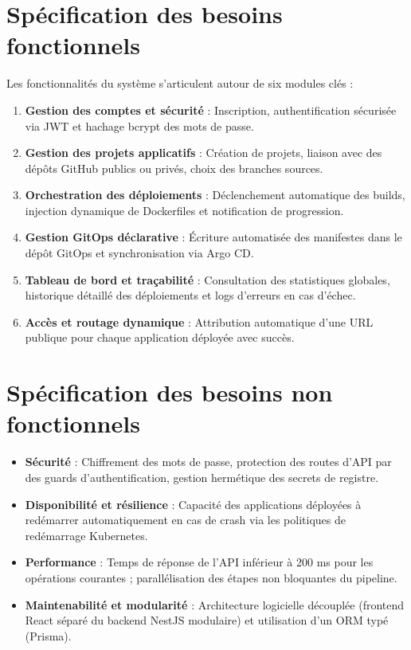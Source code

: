 \documentclass[12pt,a4paper,oneside]{report}
\begin{document}
\section{Spécification des besoins fonctionnels}
Les fonctionnalités du système s'articulent autour de six modules clés :
\begin{enumerate}
    \item \textbf{Gestion des comptes et sécurité} : Inscription, authentification sécurisée via JWT et hachage bcrypt des mots de passe.
    \item \textbf{Gestion des projets applicatifs} : Création de projets, liaison avec des dépôts GitHub publics ou privés, choix des branches sources.
    \item \textbf{Orchestration des déploiements} : Déclenchement automatique des builds, injection dynamique de Dockerfiles et notification de progression.
    \item \textbf{Gestion GitOps déclarative} : Écriture automatisée des manifestes dans le dépôt GitOps et synchronisation via Argo CD.
    \item \textbf{Tableau de bord et traçabilité} : Consultation des statistiques globales, historique détaillé des déploiements et logs d'erreurs en cas d'échec.
    \item \textbf{Accès et routage dynamique} : Attribution automatique d'une URL publique pour chaque application déployée avec succès.
\end{enumerate}

\section{Spécification des besoins non fonctionnels}
\begin{itemize}[label=$\bullet$]
    \item \textbf{Sécurité} : Chiffrement des mots de passe, protection des routes d'API par des guards d'authentification, gestion hermétique des secrets de registre.
    \item \textbf{Disponibilité et résilience} : Capacité des applications déployées à redémarrer automatiquement en cas de crash via les politiques de redémarrage Kubernetes.
    \item \textbf{Performance} : Temps de réponse de l'API inférieur à 200 ms pour les opérations courantes ; parallélisation des étapes non bloquantes du pipeline.
    \item \textbf{Maintenabilité et modularité} : Architecture logicielle découplée (frontend React séparé du backend NestJS modulaire) et utilisation d'un ORM typé (Prisma).
\end{itemize}
\end{document}
